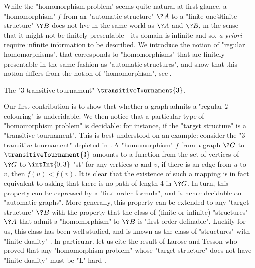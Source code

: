While the "homomorphism problem" seems quite natural at first glance, a "homomorphism" $f$
from an "automatic structure" $\?A$ to a "finite one@finite structure" $\?B$ does not live
in the same world as $\?A$ and $\?B$, in the sense that it might not be finitely presentable---its domain is infinite and so, \emph{a priori} require infinite information to be described.
We introduce the notion of "regular homomorphisms", that corresponds to "homomorphisms" that
are finitely presentable in the same fashion as "automatic structures", and show that
this notion differs from the notion of "homomorphism",
see .

\begin{marginfigure}
	\centering
	\begin{tikzpicture}
		
	\end{tikzpicture}
	\caption{
		\AP\label{fig:3-transitive-tournament}
		The "$3$-transitive tournament" $\transitiveTournament{3}$.
	}
\end{marginfigure}
Our first contribution is to show that whether a graph admits a "regular $2$-colouring" is undecidable. We then notice that a particular type of
"homomorphism problem" is decidable: for instance, if the "target structure"
is a "transitive tournament". This is best understood on an example: consider the "$3$-transitive 
tournament" depicted in .
A "homomorphism" $f$ from a graph $\?G$ to $\transitiveTournament{3}$ amounts to a function
from the set of vertices of $\?G$ to $\intInt{0,3}$ "st"
for any vertices $u$ and $v$, if there is an edge from $u$ to $v$, then
$f(u) < f(v)$. It is clear that the existence of such a mapping is in fact equivalent 
to asking that there is no path of length $4$ in $\?G$.
In turn, this property can be expressed by a "first-order formula", and is hence decidable
on "automatic graphs".
More generally, this property can be extended to any "target structure" $\?B$ with the property
that the class of (finite or infinite) "structures" $\?A$ that admit a "homomorphism" to $\?B$
is "first-order definable".
Luckily for us, this class has been well-studied, and is known as the class of "structures"
with "finite duality" \cite{Atserias2008DigraphColoring}. In particular, let us cite the result of Larose and Tesson
who proved that any "homomorphism problem" whose "target structure" does not have "finite duality"
must be "L"-hard \cite{LaroseTesson2009UniversalAlgebraCSP}.

